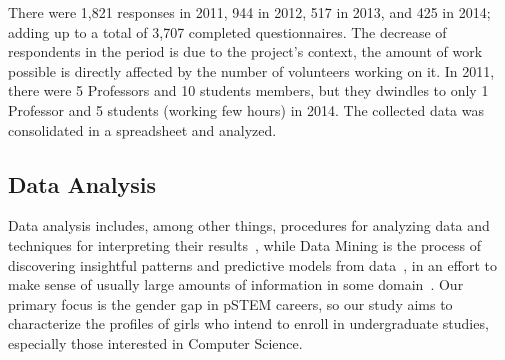 
There were 1,821 responses in 2011, 944 in 2012, 517 in 2013, and 425 in 2014; adding up to a total of 3,707 completed questionnaires. The decrease of respondents in the period is due to the project's context, the amount of work possible is directly affected by the number of volunteers working on it. In 2011, there were 5 Professors and 10 students members, but they dwindles to only 1 Professor and 5 students (working few hours) in 2014. The collected data was consolidated in a spreadsheet and analyzed.




\subsection{Data Analysis}\label{sec:analysis:related}%

Data analysis includes, among other things, procedures for analyzing data and techniques for interpreting their results~\cite{Tukey1962}, while Data Mining is the process of discovering insightful patterns and predictive models from data~\cite{Zaki2014}, in an effort to make sense of usually large amounts of information in some domain~\cite{Cios2007}. Our primary focus is the gender gap in pSTEM careers, so our study aims to characterize the profiles of girls who intend to enroll in undergraduate studies, especially those interested in Computer Science.

